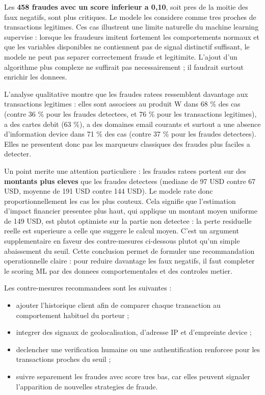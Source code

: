 ﻿\documentclass[12pt,a4paper,oneside]{report}
\begin{document}
Les \textbf{458 fraudes avec un score inferieur a 0,10}, soit pres de la moitie des faux negatifs, sont plus critiques. Le modele les considere comme tres proches de transactions legitimes. Ces cas illustrent une limite naturelle du machine learning supervise : lorsque les fraudeurs imitent fortement les comportements normaux et que les variables disponibles ne contiennent pas de signal distinctif suffisant, le modele ne peut pas separer correctement fraude et legitimite. L'ajout d'un algorithme plus complexe ne suffirait pas necessairement ; il faudrait surtout enrichir les donnees.

L'analyse qualitative montre que les fraudes ratees ressemblent davantage aux transactions legitimes : elles sont associees au produit W dans 68 \% des cas (contre 36 \% pour les fraudes detectees, et 76 \% pour les transactions legitimes), a des cartes debit (63 \%), a des domaines email courants et surtout a une absence d'information device dans 71 \% des cas (contre 37 \% pour les fraudes detectees). Elles ne presentent donc pas les marqueurs classiques des fraudes plus faciles a detecter.

Un point merite une attention particuliere : les fraudes ratees portent sur des \textbf{montants plus eleves} que les fraudes detectees (mediane de 97 USD contre 67 USD, moyenne de 191 USD contre 144 USD). Le modele rate donc proportionnellement les cas les plus couteux. Cela signifie que l'estimation d'impact financier presentee plus haut, qui applique un montant moyen uniforme de 149 USD, est plutot optimiste sur la partie non detectee : la perte residuelle reelle est superieure a celle que suggere le calcul moyen. C'est un argument supplementaire en faveur des contre-mesures ci-dessous plutot qu'un simple abaissement du seuil. Cette conclusion permet de formuler une recommandation operationnelle claire : pour reduire davantage les faux negatifs, il faut completer le scoring ML par des donnees comportementales et des controles metier.

Les contre-mesures recommandees sont les suivantes :
\begin{itemize}
    \item ajouter l'historique client afin de comparer chaque transaction au comportement habituel du porteur ;
    \item integrer des signaux de geolocalisation, d'adresse IP et d'empreinte device ;
    \item declencher une verification humaine ou une authentification renforcee pour les transactions proches du seuil ;
    \item suivre separement les fraudes avec score tres bas, car elles peuvent signaler l'apparition de nouvelles strategies de fraude.
\end{itemize}
\end{document}
